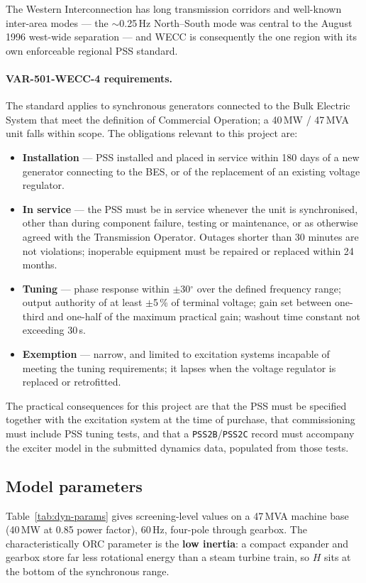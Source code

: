 The Western Interconnection has long transmission corridors and well-known
inter-area modes --- the $\sim$0.25\,Hz North--South mode was central to the
August 1996 west-wide separation --- and WECC is consequently the one region
with its own enforceable regional PSS standard.

\paragraph{VAR-501-WECC-4 requirements.} The standard applies to synchronous
generators connected to the Bulk Electric System that meet the definition of
Commercial Operation; a 40\,MW / 47\,MVA unit falls within scope. The
obligations relevant to this project are:

\begin{itemize}\setlength{\itemsep}{0.25em}
  \item \textbf{Installation} --- PSS installed and placed in service within
        180 days of a new generator connecting to the BES, or of the
        replacement of an existing voltage regulator.
  \item \textbf{In service} --- the PSS must be in service whenever the unit is
        synchronised, other than during component failure, testing or
        maintenance, or as otherwise agreed with the Transmission Operator.
        Outages shorter than 30 minutes are not violations; inoperable
        equipment must be repaired or replaced within 24 months.
  \item \textbf{Tuning} --- phase response within $\pm$30$^\circ$ over the
        defined frequency range; output authority of at least $\pm$5\,\% of
        terminal voltage; gain set between one-third and one-half of the
        maximum practical gain; washout time constant not exceeding 30\,s.
  \item \textbf{Exemption} --- narrow, and limited to excitation systems
        incapable of meeting the tuning requirements; it lapses when the
        voltage regulator is replaced or retrofitted.
\end{itemize}

\noindent
The practical consequences for this project are that the PSS must be specified
together with the excitation system at the time of purchase, that commissioning
must include PSS tuning tests, and that a \texttt{PSS2B}/\texttt{PSS2C} record
must accompany the exciter model in the submitted dynamics data, populated from
those tests.

\subsection{Model parameters}
Table~\ref{tab:dyn-params} gives screening-level values on a 47\,MVA machine
base (40\,MW at 0.85 power factor), 60\,Hz, four-pole through gearbox. The
characteristically ORC parameter is the \textbf{low inertia}: a compact expander
and gearbox store far less rotational energy than a steam turbine train, so $H$
sits at the bottom of the synchronous range.

